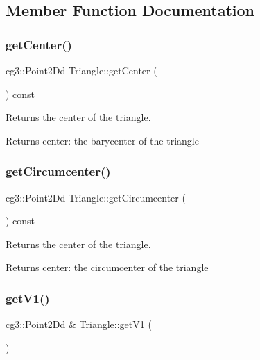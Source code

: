 \subsection{Member Function Documentation}
\mbox{\label{classTriangle_a4d120f7288b7051a1cf442268edd328d}} 
\subsubsection{\texorpdfstring{get\+Center()}{getCenter()}}
{\footnotesize\ttfamily cg3\+::\+Point2\+Dd Triangle\+::get\+Center (\begin{DoxyParamCaption}{ }\end{DoxyParamCaption}) const}



Returns the center of the triangle. 

\begin{DoxyReturn}{Returns}
center\+: the barycenter of the triangle 
\end{DoxyReturn}
\mbox{\label{classTriangle_a0ac42109ff92fc5b907283e10d7946b2}} 
\subsubsection{\texorpdfstring{get\+Circumcenter()}{getCircumcenter()}}
{\footnotesize\ttfamily cg3\+::\+Point2\+Dd Triangle\+::get\+Circumcenter (\begin{DoxyParamCaption}{ }\end{DoxyParamCaption}) const}



Returns the center of the triangle. 

\begin{DoxyReturn}{Returns}
center\+: the circumcenter of the triangle 
\end{DoxyReturn}
\mbox{\label{classTriangle_a67057550ec55c6fbd3e1cf512fb88c4a}} 
\subsubsection{\texorpdfstring{get\+V1()}{getV1()}}
{\footnotesize\ttfamily cg3\+::\+Point2\+Dd \& Triangle\+::get\+V1 (\begin{DoxyParamCaption}{ }\end{DoxyParamCaption})}



